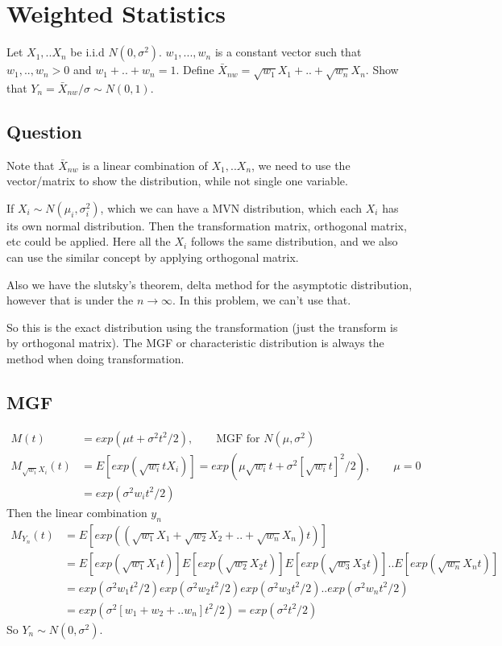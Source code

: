 \section{Weighted Statistics}
Let $X_1,.. X_n$ be i.i.d $N(0, \sigma^2)$. $w_1, ..., w_n$ is a constant vector such that $w_1,.., w_n > 0$ and $w_1 + .. + w_n = 1$. Define $\bar{X}_{nw} = \sqrt{w_1} X_1 + .. + \sqrt{w_n} X_n$. Show that $Y_n = \bar{X}_{nw}/\sigma \sim N(0,1)$. 

\subsection{Question}

Note that $\bar{X}_{nw}$ is a linear combination of $X_1,.. X_n$, we need to use the vector/matrix to show the distribution, while not single one variable. 

If $X_i \sim N(\mu_i, \sigma_i^2)$, which we can have a MVN distribution, which each $X_i$ has its own normal distribution. Then the transformation matrix, orthogonal matrix, etc could be applied. Here all the $X_i$ follows the same distribution, and we also can use the similar concept by applying orthogonal matrix. 

Also we have the slutsky's theorem, delta method for the asymptotic distribution, however that is under the $n \rightarrow \infty$. In this problem, we can't use that.

So this is the exact distribution using the transformation (just the transform is by orthogonal matrix). The MGF or characteristic distribution is always the method when doing transformation.

\subsection{MGF}

\begin{align*}
	M(t) &= exp(\mu t + \sigma^2 t^2/2), \qquad \text{MGF for } N(\mu, \sigma^2)\\
	M_{\sqrt{w_i}X_i}(t) &= E[exp(\sqrt{w_i} t X_i)] = exp(\mu \sqrt{w_i} t + \sigma^2 [\sqrt{w_i} t]^2/2), \qquad \mu=0 \\
	&= exp(\sigma^2 w_i t^2/2)
\end{align*}
Then the linear combination $y_n$
\begin{align*}
	M_{Y_n}(t) &= E[exp \left( (\sqrt{w_1} X_1 + \sqrt{w_2} X_2 + .. + \sqrt{w_n} X_n) t \right)] \\
	&= E[exp(\sqrt{w_1} X_1 t)] E[exp(\sqrt{w_2} X_2 t)] E[exp(\sqrt{w_3} X_3 t)].. E[exp(\sqrt{w_n} X_n t)] \\
	&= exp(\sigma^2 w_1 t^2/2) exp(\sigma^2 w_2 t^2/2) exp(\sigma^2 w_3 t^2/2).. exp(\sigma^2 w_n t^2/2) \\
	&= exp(\sigma^2 [w_1+ w_2 + .. w_n] t^2/2) = exp(\sigma^2 t^2/2)
\end{align*}
So $Y_n \sim N(0, \sigma^2)$. 

